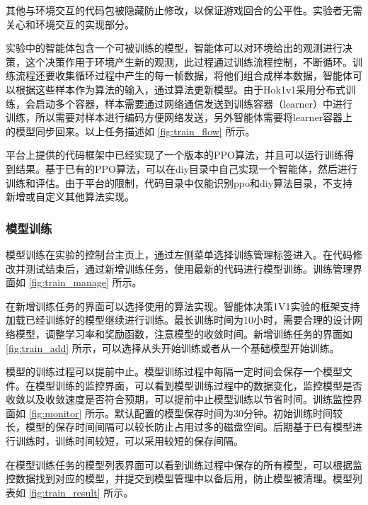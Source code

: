 其他与环境交互的代码包被隐藏防止修改，以保证游戏回合的公平性。实验者无需关心和环境交互的实现部分。


实验中的智能体包含一个可被训练的模型，智能体可以对环境给出的观测进行决策，这个决策作用于环境产生新的观测，此过程通过训练流程控制，不断循环。训练流程还要收集循环过程中产生的每一帧数据，将他们组合成样本数据，智能体可以根据这些样本作为算法的输入，通过算法更新模型。由于Hok1v1采用分布式训练，会启动多个容器，样本需要通过网络通信发送到训练容器（learner）中进行训练，所以需要对样本进行编码方便网络发送，另外智能体需要将learner容器上的模型同步回来。以上任务描述如 \cref{fig:train_flow} 所示。


平台上提供的代码框架中已经实现了一个版本的PPO算法，并且可以运行训练得到结果。基于已有的PPO算法，可以在diy目录中自己实现一个智能体，然后进行训练和评估。由于平台的限制，代码目录中仅能识别ppo和diy算法目录，不支持新增或自定义其他算法实现。

\subsubsection{模型训练}

模型训练在实验的控制台主页上，通过左侧菜单选择训练管理标签进入。在代码修改并测试结束后，通过新增训练任务，使用最新的代码进行模型训练。训练管理界面如 \cref{fig:train_manage} 所示。

在新增训练任务的界面可以选择使用的算法实现。智能体决策1V1实验的框架支持加载已经训练好的模型继续进行训练。最长训练时间为10小时，需要合理的设计网络模型，调整学习率和奖励函数，注意模型的收敛时间。新增训练任务的界面如 \cref{fig:train_add} 所示，可以选择从头开始训练或者从一个基础模型开始训练。

模型的训练过程可以提前中止。模型训练过程中每隔一定时间会保存一个模型文件。在模型训练的监控界面，可以看到模型训练过程中的数据变化，监控模型是否收敛以及收敛速度是否符合预期，可以提前中止模型训练以节省时间。训练监控界面如 \cref{fig:monitor} 所示。默认配置的模型保存时间为30分钟。初始训练时间较长，模型的保存时间间隔可以较长防止占用过多的磁盘空间。后期基于已有模型进行训练时，训练时间较短，可以采用较短的保存间隔。


在模型训练任务的模型列表界面可以看到训练过程中保存的所有模型，可以根据监控数据找到对应的模型，并提交到模型管理中以备后用，防止模型被清理。模型列表如 \cref{fig:train_result} 所示。

